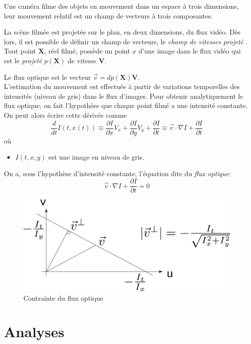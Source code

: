 \documentclass[a4paper,12pt]{report}
\begin{document}
Une caméra filme des objets en mouvement dans un espace à trois dimensions, leur mouvement relatif est un champ de vecteurs à trois composantes. 

La scène filmée est projetée sur le plan, en deux dimensions, du flux vidéo. Dès lors, il est possible de définir un champ de vecteurs, le \textit{champ de vitesses projeté} \cite{r}. \\

Tout point $\textbf{X}$, réel filmé, possède un point $x$ d'une image dans le flux vidéo qui est le \textit{projeté} $p(\textbf{X})$ de vitesse $\textbf{V}$. 

Le flux optique est le vecteur $\vec v = dp(\textbf{X})\textbf{V}$.\\
 
L'estimation du mouvement est effectuée à partir de variations temporelles des intensités (niveau de gris) dans le flux d'images. Pour obtenir analytiquement le flux optique, on fait l'hypothèse que chaque point filmé a une intensité constante. On peut alors écrire cette dérivée comme $$\frac{d}{dt}I(t,x(t)) \equiv \frac{\partial I}{\partial x}V_x+\frac{\partial I}{\partial y}V_y+\frac{\partial I}{\partial t} \equiv \vec v \cdot \nabla I + \frac{\partial I}{\partial t}$$
où 
\begin{itemize}
\item[] $I(t,x,y)$ est une image en niveau de gris.\\
\end{itemize}
On a, sous l'hypothèse d'intensité constante, l'équation dite du \textit{flux optique}:
$$\vec v \cdot \nabla I + \frac{\partial I}{\partial t} = 0 $$ 
\begin{figure}[hbtp]
\centering
\includegraphics[scale=0.4]{figureOpticalConstraint.png}
\caption{Contrainte du flux optique}
\end{figure}

\section{Analyses}
\end{document}

